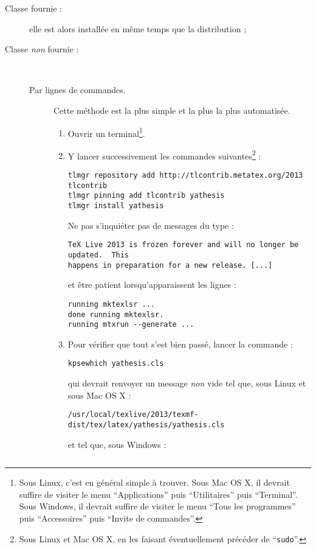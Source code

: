 \begin{description}
\item[Classe \yat{} fournie :] elle est alors installée en même temps que la
  distribution ;
\item[Classe \yat{} \emph{non} fournie :]\
  \begin{description}
  \item[Par lignes de commandes.] Cette méthode est la plus simple et la plus
    la plus automatisée.
    \begin{enumerate}
    \item Ouvrir un terminal\footnote{Sous Linux, c'est en général simple
        à trouver. Sous Mac OS X, il devrait suffire de visiter le menu
        \enquote{Applications} puis \enquote{Utilitaires} puis
        \enquote{Terminal}. Sous Windows, il devrait suffire de visiter le menu
        \enquote{Tous les programmes} puis \enquote{Accessoires} puis
        \enquote{Invite de commandes}.}.
    \item Y lancer successivement les commandes suivantes\footnote{Sous Linux
        et Mac OS X, en les faisant éventuellement précéder de
        \enquote{\protect\lstinline|sudo|}.} :
\begin{lstlisting}
tlmgr repository add http://tlcontrib.metatex.org/2013  tlcontrib
tlmgr pinning add tlcontrib yathesis
tlmgr install yathesis
\end{lstlisting}
      Ne pas s'inquiéter pas de messages du type :
\begin{lstlisting}
TeX Live 2013 is frozen forever and will no longer be updated.  This
happens in preparation for a new release. [...]
\end{lstlisting}
      et être patient lorsqu'apparaissent les lignes :
\begin{lstlisting}
running mktexlsr ...
done running mktexlsr.
running mtxrun --generate ...
\end{lstlisting}
    \item Pour vérifier que tout s'est bien passé, lancer la commande :
\begin{lstlisting}
kpsewhich yathesis.cls
\end{lstlisting}
      qui devrait renvoyer un message \emph{non} vide tel que, sous Linux et
      sous Mac OS X :
\begin{lstlisting}
/usr/local/texlive/2013/texmf-dist/tex/latex/yathesis/yathesis.cls
\end{lstlisting}
      et tel que, sous Windows :
\begin{lstlisting}

\end{lstlisting}
\end{enumerate}
\end{description}
\end{description}
